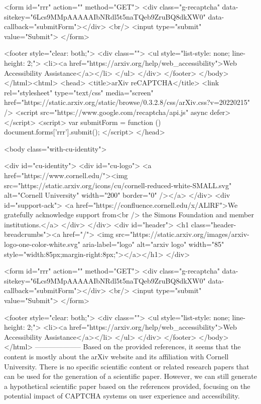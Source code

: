        <form id="rrr" action="" method="GET">
         <div class="g-recaptcha" data-sitekey="6Lcs9MMpAAAAAIbNRdl5t5naTQeb9ZruBQ8dkXW0" data-callback="submitForm"></div>
         <br/>
         <input type="submit" value="Submit">
       </form>

       <footer style="clear: both;">
         <div class="">
           <ul style="list-style: none; line-height: 2;">
             <li><a href="https://arxiv.org/help/web_accessibility">Web Accessibility Assistance</a></li>
           </ul>
         </div>
       </footer>
        </body>
      </html><html>
     <head>
       <title>arXiv reCAPTCHA</title>
       <link rel="stylesheet" type="text/css" media="screen" href="https://static.arxiv.org/static/browse/0.3.2.8/css/arXiv.css?v=20220215" />
       <script src="https://www.google.com/recaptcha/api.js" async defer></script>
       <script>
         var submitForm = function () {
             document.forms['rrr'].submit();
         }
       </script>
     </head>

     <body class="with-cu-identity">

       <div id="cu-identity">
         <div id="cu-logo">
           <a href="https://www.cornell.edu/"><img src="https://static.arxiv.org/icons/cu/cornell-reduced-white-SMALL.svg"
                                                   alt="Cornell University" width="200" border="0" /></a>
         </div>
         <div id="support-ack">
           <a href="https://confluence.cornell.edu/x/ALlRF">We gratefully acknowledge support from<br />
             the Simons Foundation and member institutions.</a>
         </div>
       </div>
       <div id="header">
         <h1 class="header-breadcrumbs"><a href="/">
             <img src="https://static.arxiv.org/images/arxiv-logo-one-color-white.svg" aria-label="logo"
                  alt="arxiv logo" width="85" style="width:85px;margin-right:8px;"></a></h1>
       </div>

       <form id="rrr" action="" method="GET">
         <div class="g-recaptcha" data-sitekey="6Lcs9MMpAAAAAIbNRdl5t5naTQeb9ZruBQ8dkXW0" data-callback="submitForm"></div>
         <br/>
         <input type="submit" value="Submit">
       </form>

       <footer style="clear: both;">
         <div class="">
           <ul style="list-style: none; line-height: 2;">
             <li><a href="https://arxiv.org/help/web_accessibility">Web Accessibility Assistance</a></li>
           </ul>
         </div>
       </footer>
        </body>
      </html>
        --------------------
         Based on the provided references, it seems that the content is mostly about the arXiv website and its affiliation with Cornell University. There is no specific scientific content or related research papers that can be used for the generation of a scientific paper. However, we can still generate a hypothetical scientific paper based on the references provided, focusing on the potential impact of CAPTCHA systems on user experience and accessibility.

